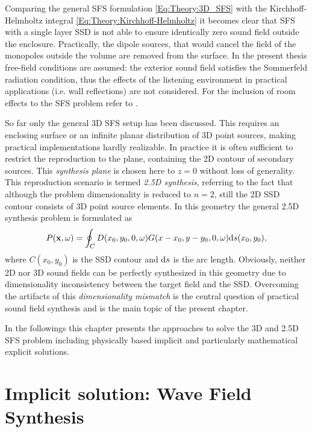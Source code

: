 Comparing the general SFS formulation \eqref{Eq:Theory:3D_SFS} with the Kirchhoff-Helmholtz integral \eqref{Eq:Theory:Kirchhoff-Helmholtz} it becomes clear that SFS with a single layer SSD is not able to ensure identically zero sound field outside the enclosure.
Practically, the dipole sources, that would cancel the field of the monopoles outside the volume are removed from the surface.
In the present thesis free-field conditions are assumed: the exterior sound field satisfies the Sommerfeld radiation condition, thus the effects of the listening environment in practical applications (i.e. wall reflections) are not considered. 
For the inclusion of room effects to the SFS problem refer to \cite{Spors2005}.

\vspace{3mm}
So far only the general 3D SFS setup has been discussed.
This requires an enclosing surface or an infinite planar distribution of 3D point sources, making practical implementations hardly realizable.
In practice it is often sufficient to restrict the reproduction to the plane, containing the 2D contour of secondary sources.
This \emph{synthesis plane} is chosen here to $z=0$ without loss of generality.
This reproduction scenario is termed \emph{2.5D synthesis}, referring to the fact that although the problem dimensionality is reduced to $n=2$, still the 2D SSD contour consists of 3D point source elements.
In this geometry the general 2.5D synthesis problem is formulated as
\begin{equation}
P(\mathbf{x},\omega) = \oint_{C} D(x_0,y_0,0,\omega) G(x - x_0, y-y_0, 0 , \omega ) \mathrm{d} s( x_0, y_0 ),
\label{Eq:Theory:25D_SFS}
\end{equation}
where $C(x_0,y_0)$ is the SSD contour and $\mathrm{d} s$ is the arc length.
Obviously, neither 2D nor 3D sound fields can be perfectly synthesized in this geometry due to dimensionality inconsistency between the target field and the SSD.
Overcoming the artifacts of this \emph{dimensionality mismatch} is the central question of practical sound field synthesis and is the main topic of the present chapter.

In the followings this chapter presents the approaches to solve the 3D and 2.5D SFS problem including physically based implicit and particularly mathematical explicit solutions. 

\section{Implicit solution: Wave Field Synthesis}

